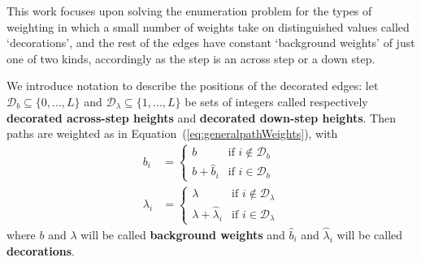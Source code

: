 \documentclass[11pt,a4paper]{article}
\newcommand{\la}{\lambda}
\newcommand{\bd}{\hat{b}}		%
\newcommand{\lad}{\hat{\lambda}}	%
\newcommand{\defin}[1]{\textbf{#1}}		%
\begin{document}
This work focuses upon solving the enumeration problem for the types of weighting in which a small number of weights take on distinguished values called `decorations', and the rest of the edges have constant `background weights' of just one of two kinds, accordingly as the step is an across step or a down step.

We introduce notation to describe the positions of the decorated  edges:
let $\mathcal{D}_{b} \subseteq \{0,...,L\}$ and $\mathcal{D}_{\la} \subseteq \{1,...,L\}$ be sets of integers called respectively \defin{decorated across-step heights} and \defin{decorated down-step heights}.  Then paths are weighted as in Equation~(\ref{eq:generalpathWeights}), with
\begin{subequations}\label{eq:lailall} \begin{align} 
	b_i &= \begin{cases}
			b 				& 	\text{if $i \notin \mathcal{D}_{b}$}\\
		  b + \bd_i &  \text{if $i \in\mathcal{D}_{b}$}
	\end{cases}
	 \\
	\la_i &= \begin{cases}
			\la 				& 	\text{if $i \notin \mathcal{D}_{\la}$}\\
		  \la + \lad_i &  \text{if $i \in\mathcal{D}_{\la}$}
	\end{cases} \label{eq:laila}	
\end{align}\end{subequations}
where  $b$ and $\la$ will be called \defin{background weights} and $\bd_i$ and $\lad_i$ will be called \defin{decorations}.
\end{document}
